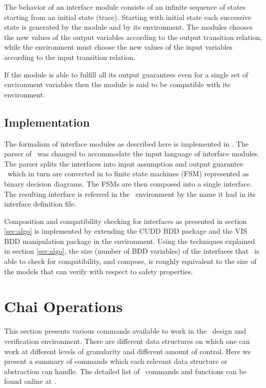 The behavior of an interface module consists of an infinite
sequence of states starting from an initial state (trace).
Starting with initial state each successive state is generated by
the module and by its environment. The modules chooses the new
values of the output variables according to the output transition
relation, while the environment must choose the new values of the
input variables according to the input transition relation.

If the module is able to fulfill all its output guarantees even
for a single set of environment variables then the module is said
to be compatible with its environment.

\subsection{Implementation}
The formalism of interface modules as described here is
implemented in {\chai }. The parser of \mocha \ was changed to
accommodate the input language of interface modules. The parser
splits the interfaces into input assumption and output guarantee
\rm \ which in turn are converted in to finite state machines
(FSM) represented as binary decision diagrams. The FSMs are then
composed into a single interface. The resulting interface is
referred in the \chai \ environment by the name it had in its
interface definition file.

Composition and compatibility checking for interfaces as presented
in section \ref{sec:algo} is implemented by extending the CUDD BDD
package and the VIS BDD manipulation package \cite{VIS96} in the
{\chai } environment. Using the techniques explained in section
\ref{sec:algo}, the size (number of BDD variables) of the
interfaces that \chai \ is able to check for compatibility, and
compose, is roughly equivalent to the size of the models that
\mocha \cite{Mo98} can verify with respect to safety properties.

\section{Chai Operations}
This section presents various commands available to work in the
\chai \ design and verification environment. There are different
data structures on which one can work at different levels of
granularity and different amount of control. Here we present a
summary of commands which each relevant data structure or
abstraction can handle. The detailed list of \chai \ commands and
functions can be found online at \cite{getchai}.

